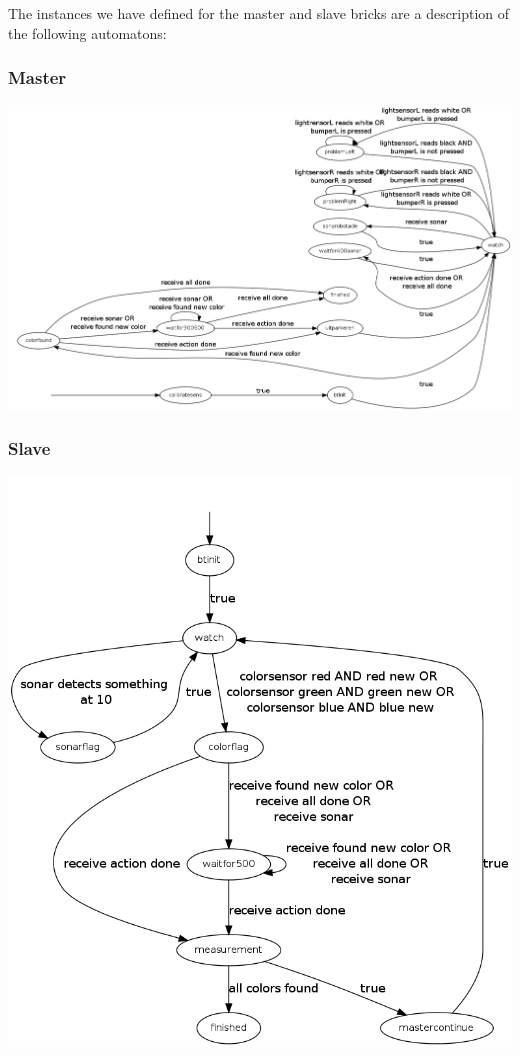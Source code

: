 \documentclass[11pt,a4paper]{article}
\begin{document}
The instances we have defined for the master and slave bricks are a description of the following automatons:

\subsubsection{Master}
\includegraphics[width=24cm,angle=90,origin=c]{t9-m.png}

\subsubsection{Slave}
\includegraphics[width=16cm]{t9-s.png}
\end{document}

